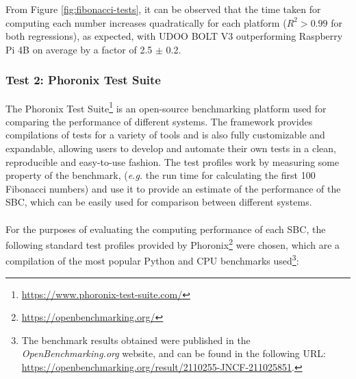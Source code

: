 From Figure \ref{fig:fibonacci-tests}, it can be observed that the time taken for computing each number increases quadratically for each platform ($R^2>0.99$ for both regressions), as expected, with UDOO BOLT V3 outperforming Raspberry Pi 4B on average by a factor of 2.5 $\pm$ 0.2.




\subsubsection{Test 2: Phoronix Test Suite}

The Phoronix Test Suite\footnote{\url{https://www.phoronix-test-suite.com/}} is an open-source benchmarking platform used for comparing the performance of different systems. The framework provides compilations of tests for a variety of tools and is also fully customizable and expandable, allowing users to develop and automate their own tests in a clean, reproducible and easy-to-use fashion. The test profiles work by measuring some property of the benchmark, (\textit{e.g.} the run time for calculating the first 100 Fibonacci numbers) and use it to provide an estimate of the performance of the \acs{SBC}, which can be easily used for comparison between different systems. 

\paragraph{} For the purposes of evaluating the computing performance of each \acs{SBC}, the following standard test profiles provided by Phoronix\footnote{\url{https://openbenchmarking.org/}} were chosen, which are a compilation of the most popular Python and \acf{CPU} benchmarks used\footnote{The benchmark results obtained were published in the \textit{OpenBenchmarking.org} website, and can be found in the following URL: \url{https://openbenchmarking.org/result/2110255-JNCF-211025851}.}:

